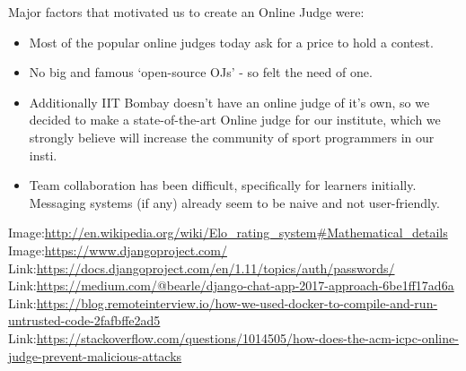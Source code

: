 \documentclass[hidelinks, a4paper,12pt, titlepage]{article}
\begin{document}
Major factors that motivated us to create an Online Judge were:
\begin{itemize}
\item Most of the popular online judges today ask for a price to hold a contest.
\item No big and famous `open-source OJs' - so felt the need of one.
\item Additionally IIT Bombay doesn't have an online judge of it's own, so we decided to make a state-of-the-art Online judge for our institute, which we strongly believe will increase the community of sport programmers in our insti. 
\item Team collaboration has been difficult, specifically for learners initially. Messaging systems (if any) already seem to be naive and not user-friendly.
\end{itemize}
\newpage
\begin{minipage}{400pt}
\begin{thebibliography}{20}
	Image:\hspace{10pt}\url{http://en.wikipedia.org/wiki/Elo_rating_system#Mathematical_details}
	Image:\hspace{10pt}\url{https://www.djangoproject.com/}
	Link:\hspace{10pt}\url{https://docs.djangoproject.com/en/1.11/topics/auth/passwords/}
	Link:\hspace{10pt}\url{https://medium.com/@bearle/django-chat-app-2017-approach-6be1ff17ad6a}
	Link:\hspace{10pt}\url{https://blog.remoteinterview.io/how-we-used-docker-to-compile-and-run-untrusted-code-2fafbffe2ad5}
	Link:\hspace{10pt}\url{https://stackoverflow.com/questions/1014505/how-does-the-acm-icpc-online-judge-prevent-malicious-attacks}
\end{thebibliography}
\end{minipage}
\end{document}
